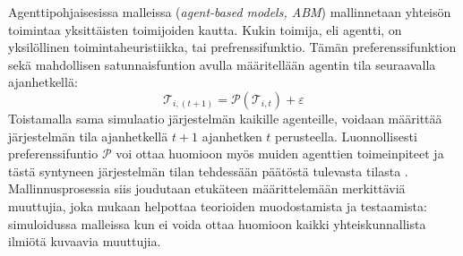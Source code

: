 \documentclass[finnish,gradu,twoside,12pt]{tktltiki}
\begin{document}
Agenttipohjaisesissa malleissa (\textit{agent-based models, ABM}) mallinnetaan yhteisön toimintaa yksittäisten toimijoiden kautta. Kukin toimija, eli agentti, on yksilöllinen toimintaheuristiikka, tai prefrenssifunktio. Tämän preferenssifunktion sekä mahdollisen satunnaisfuntion avulla määritellään agentin tila seuraavalla ajanhetkellä: \begin{equation}\mathcal{T}_{i,(t+1)} = \mathcal{P}( \mathcal{T}_{i,t} ) + \varepsilon \label{abm:yhtälö}\end{equation} Toistamalla sama simulaatio järjestelmän kaikille agenteille, voidaan määrittää järjestelmän tila ajanhetkellä $t+1$ ajanhetken $t$ perusteella. Luonnollisesti preferenssifuntio $\mathcal{P}$ voi ottaa huomioon myös muiden agenttien toimeinpiteet ja tästä syntyneen järjestelmän tilan tehdessään päätöstä tulevasta tilasta \citep[esimerkiksi][]{Bonabeau2002}. Mallinnusprosessia siis joudutaan etukäteen määrittelemään merkittäviä muuttujia, joka \citet{Gilbert1993} mukaan helpottaa teorioiden muodostamista ja testaamista: simuloidussa malleissa kun ei voida ottaa huomioon kaikki yhteiskunnallista ilmiötä kuvaavia muuttujia.
\end{document}
